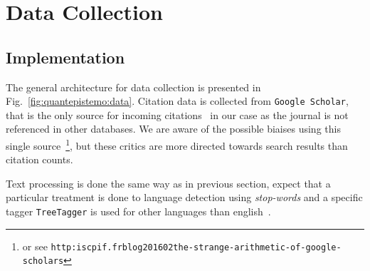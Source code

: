 



\section{Data Collection}
\label{sec:data}



\subsection{Implementation}


The general architecture for data collection is presented in Fig.~\ref{fig:quantepistemo:data}. Citation data is collected from \texttt{Google Scholar}, that is the only source for incoming citations~\cite{noruzi2005google} in our case as the journal is not referenced in other databases. We are aware of the possible biaises using this single source~\cite{bohannon2014scientific}\footnote{or see \texttt{http:\/\/iscpif.fr\/blog\/2016\/02\/the-strange-arithmetic-of-google-scholars}}, but these critics are more directed towards search results than citation counts. 

Text processing is done the same way as in previous section, expect that a particular treatment is done to language detection using \emph{stop-words} and a specific tagger \texttt{TreeTagger} is used for other languages than english~\cite{schmid1994probabilistic}.


